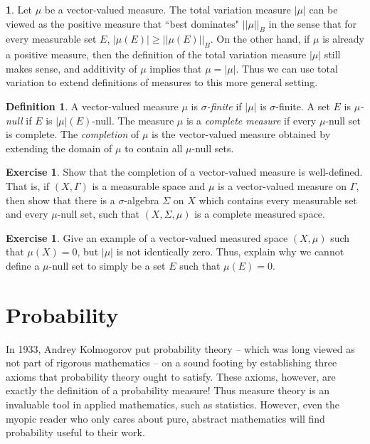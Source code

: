 \documentclass[12pt]{book}
\newcommand{\dfn}[1]{\emph{#1}\index{#1}}
\theoremstyle{definition}
\newtheorem{subsec}[theorem]{}
\newtheorem{definition}[theorem]{Definition}
\newtheorem{exercise}[theorem]{Exercise}
\begin{document}
\begin{subsec}
Let $\mu$ be a vector-valued measure.
The total variation measure $|\mu|$ can be viewed as the positive measure that ``best dominates" $||\mu||_B$ in the sense that for every measurable set $E$, $|\mu(E)| \geq ||\mu(E)||_B$.
On the other hand, if $\mu$ is already a positive measure, then the definition of the total variation measure $|\mu|$ still makes sense, and additivity of $\mu$ implies that $\mu = |\mu|$.
Thus we can use total variation to extend definitions of measures to this more general setting.
\end{subsec}

\begin{definition}
A vector-valued measure $\mu$ is \dfn{$\sigma$-finite} if $|\mu|$ is $\sigma$-finite.
A set $E$ is \dfn{$\mu$-null} if $E$ is $|\mu|(E)$-null.
The measure $\mu$ is a \dfn{complete measure} if every $\mu$-null set is complete.
The \dfn{completion} of $\mu$ is the vector-valued measure obtained by extending the domain of $\mu$ to contain all $\mu$-null sets.
\end{definition}

\begin{exercise}
Show that the completion of a vector-valued measure is well-defined.
That is, if $(X, \Gamma)$ is a measurable space and $\mu$ is a vector-valued measure on $\Gamma$, then show that there is a $\sigma$-algebra $\Sigma$ on $X$ which contains every measurable set and every $\mu$-null set, such that $(X, \Sigma, \mu)$ is a complete measured space.
\end{exercise}

\begin{exercise}
Give an example of a vector-valued measured space $(X, \mu)$ such that $\mu(X) = 0$, but $|\mu|$ is not identically zero.
Thus, explain why we cannot define a $\mu$-null set to simply be a set $E$ such that $\mu(E) = 0$.
\end{exercise}


\section{Probability}
In 1933, Andrey Kolmogorov put probability theory -- which was long viewed as not part of rigorous mathematics -- on a sound footing by establishing three axioms that probability theory ought to satisfy.
These axioms, however, are exactly the definition of a probability measure!
Thus measure theory is an invaluable tool in applied mathematics, such as statistics.
However, even the myopic reader who only cares about pure, abstract mathematics will find probability useful to their work.
\end{document}
